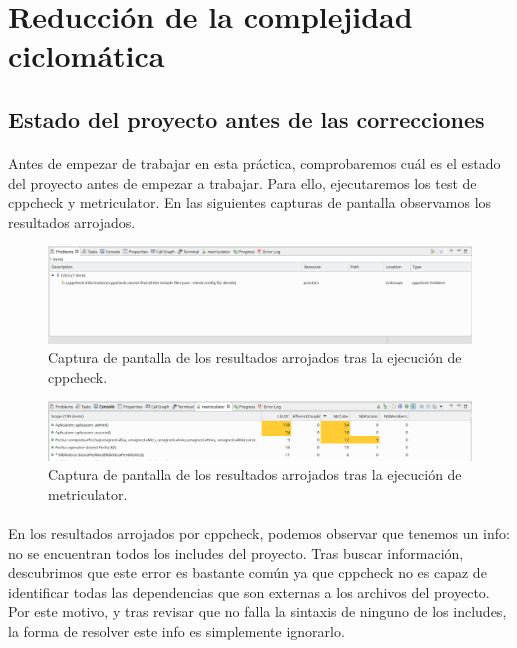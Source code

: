 \section{Reducción de la complejidad ciclomática}

	\subsection{Estado del proyecto antes de las correcciones}

		\paragraph{}Antes de empezar de trabajar en esta práctica, comprobaremos cuál es el estado del proyecto antes de empezar a trabajar. Para ello, ejecutaremos los test de cppcheck y metriculator. En las siguientes capturas de pantalla observamos los resultados arrojados.

 		\begin{figure}[H]
 			\centering
 			\includegraphics[scale=0.32]{img/captura94.png}
 			\caption{Captura de pantalla de los resultados arrojados tras la ejecución de cppcheck.}
 			\label{captura94}
 		\end{figure}
 	
 		\begin{figure}[H]
 			\centering
 			\includegraphics[scale=0.32]{img/captura95.png}
 			\caption{Captura de pantalla de los resultados arrojados tras la ejecución de metriculator.}
 			\label{captura95}
 		\end{figure}
 	
 		\paragraph{}En los resultados arrojados por cppcheck, podemos observar que tenemos un info: no se encuentran todos los includes del proyecto. Tras buscar información, descubrimos que este error es bastante común ya que cppcheck no es capaz de identificar todas las dependencias que son externas a los archivos del proyecto. Por este motivo, y tras revisar que no falla la sintaxis de ninguno de los includes, la forma de resolver este info es simplemente ignorarlo.
 		
